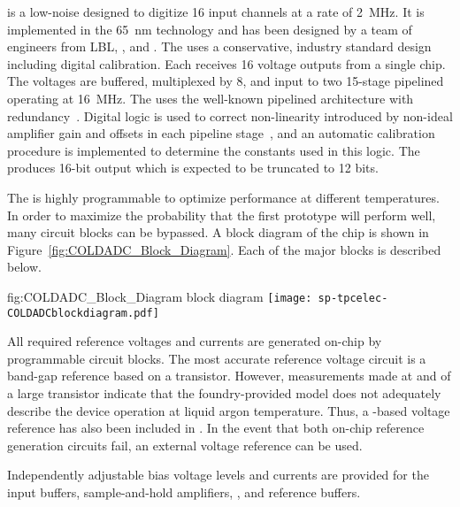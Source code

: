  is a low-noise   designed to digitize
\num{16} input channels at a rate of \SI{2}{MHz}. It is implemented in the 
\SI{65}{nm}  technology and has been designed by a team of engineers
from LBL, , and .  The  uses a conservative,
industry standard design including digital calibration.  Each 
receives \num{16} voltage outputs from a single  chip.  The voltages
are buffered, multiplexed by \num{8}, and input to two \num{15}-stage pipelined 
operating at \SI{16}{MHz}.  The  uses the well-known pipelined architecture
with redundancy~\cite{PipelinedADC}.  Digital logic is used to correct non-linearity
introduced by non-ideal amplifier gain and offsets in each pipeline
stage~\cite{CalibrationCorrection}, and an automatic calibration procedure is
implemented to determine the constants used in this logic.  The  produces
\num{16}-bit output which is expected to be truncated to \num{12} bits.

The  is highly programmable to optimize performance at different
temperatures.  In order to maximize the probability that the first prototype
 will perform well, many circuit blocks can be bypassed. A block
diagram of the chip is shown in Figure~\ref{fig:COLDADC_Block_Diagram}. Each of
the major blocks is described below.

\begin{dunefigure}
{fig:COLDADC_Block_Diagram}
{ block diagram}
\texttt{[image: sp-tpcelec-COLDADCblockdiagram.pdf]}
\end{dunefigure}

All required reference voltages and currents are generated on-chip by programmable
circuit blocks. The most accurate reference voltage circuit is a band-gap reference
based on a  transistor.  However, measurements made at  and
 of a large  transistor indicate that the foundry-provided  model
does not adequately describe the device operation at liquid argon temperature.  Thus,
a -based voltage reference has also been included in .
In the event that both on-chip reference generation circuits fail, an external voltage
reference can be used.

Independently adjustable bias voltage levels and currents are provided for the
input buffers, sample-and-hold amplifiers, , and 
reference buffers.

